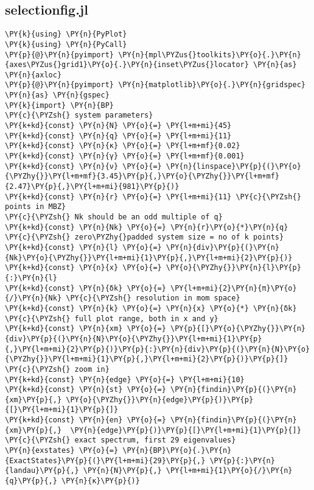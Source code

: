\subsection{selection\textunderscore fig.jl}\label{subsec:selection}
\begin{Verbatim}[commandchars=\\\{\}]
\PY{k}{using} \PY{n}{PyPlot}
\PY{k}{using} \PY{n}{PyCall}
\PY{p}{@}\PY{n}{pyimport} \PY{n}{mpl\PYZus{}toolkits}\PY{o}{.}\PY{n}{axes\PYZus{}grid1}\PY{o}{.}\PY{n}{inset\PYZus{}locator} \PY{n}{as} \PY{n}{axloc}
\PY{p}{@}\PY{n}{pyimport} \PY{n}{matplotlib}\PY{o}{.}\PY{n}{gridspec} \PY{n}{as} \PY{n}{gspec}
\PY{k}{import} \PY{n}{BP}
\PY{c}{\PYZsh{} system parameters}
\PY{k+kd}{const} \PY{n}{N} \PY{o}{=} \PY{l+m+mi}{45}
\PY{k+kd}{const} \PY{n}{q} \PY{o}{=} \PY{l+m+mi}{11}
\PY{k+kd}{const} \PY{n}{κ} \PY{o}{=} \PY{l+m+mf}{0.02}
\PY{k+kd}{const} \PY{n}{γ} \PY{o}{=} \PY{l+m+mf}{0.001}
\PY{k+kd}{const} \PY{n}{ν} \PY{o}{=} \PY{n}{linspace}\PY{p}{(}\PY{o}{\PYZhy{}}\PY{l+m+mf}{3.45}\PY{p}{,}\PY{o}{\PYZhy{}}\PY{l+m+mf}{2.47}\PY{p}{,}\PY{l+m+mi}{981}\PY{p}{)}
\PY{k+kd}{const} \PY{n}{r} \PY{o}{=} \PY{l+m+mi}{11} \PY{c}{\PYZsh{} points in MBZ}
\PY{c}{\PYZsh{} Nk should be an odd multiple of q}
\PY{k+kd}{const} \PY{n}{Nk} \PY{o}{=} \PY{n}{r}\PY{o}{*}\PY{n}{q} \PY{c}{\PYZsh{} zero\PYZhy{}padded system size = no of k points}
\PY{k+kd}{const} \PY{n}{l} \PY{o}{=} \PY{n}{div}\PY{p}{(}\PY{n}{Nk}\PY{o}{\PYZhy{}}\PY{l+m+mi}{1}\PY{p}{,}\PY{l+m+mi}{2}\PY{p}{)}
\PY{k+kd}{const} \PY{n}{x} \PY{o}{=} \PY{o}{\PYZhy{}}\PY{n}{l}\PY{p}{:}\PY{n}{l}
\PY{k+kd}{const} \PY{n}{δk} \PY{o}{=} \PY{l+m+mi}{2}\PY{n}{π}\PY{o}{/}\PY{n}{Nk} \PY{c}{\PYZsh{} resolution in mom space}
\PY{k+kd}{const} \PY{n}{k} \PY{o}{=} \PY{n}{x} \PY{o}{*} \PY{n}{δk}
\PY{c}{\PYZsh{} full plot range, both in x and y}
\PY{k+kd}{const} \PY{n}{xm} \PY{o}{=} \PY{p}{[}\PY{o}{\PYZhy{}}\PY{n}{div}\PY{p}{(}\PY{n}{N}\PY{o}{\PYZhy{}}\PY{l+m+mi}{1}\PY{p}{,}\PY{l+m+mi}{2}\PY{p}{)}\PY{p}{:}\PY{n}{div}\PY{p}{(}\PY{n}{N}\PY{o}{\PYZhy{}}\PY{l+m+mi}{1}\PY{p}{,}\PY{l+m+mi}{2}\PY{p}{)}\PY{p}{]}
\PY{c}{\PYZsh{} zoom in}
\PY{k+kd}{const} \PY{n}{edge} \PY{o}{=} \PY{l+m+mi}{10}
\PY{k+kd}{const} \PY{n}{st} \PY{o}{=} \PY{n}{findin}\PY{p}{(}\PY{n}{xm}\PY{p}{,} \PY{o}{\PYZhy{}}\PY{n}{edge}\PY{p}{)}\PY{p}{[}\PY{l+m+mi}{1}\PY{p}{]}
\PY{k+kd}{const} \PY{n}{en} \PY{o}{=} \PY{n}{findin}\PY{p}{(}\PY{n}{xm}\PY{p}{,}  \PY{n}{edge}\PY{p}{)}\PY{p}{[}\PY{l+m+mi}{1}\PY{p}{]}
\PY{c}{\PYZsh{} exact spectrum, first 29 eigenvalues}
\PY{n}{exstates} \PY{o}{=} \PY{n}{BP}\PY{o}{.}\PY{n}{ExactStates}\PY{p}{(}\PY{l+m+mi}{29}\PY{p}{,} \PY{p}{:}\PY{n}{landau}\PY{p}{,} \PY{n}{N}\PY{p}{,} \PY{l+m+mi}{1}\PY{o}{/}\PY{n}{q}\PY{p}{,} \PY{n}{κ}\PY{p}{)}

\end{Verbatim}
